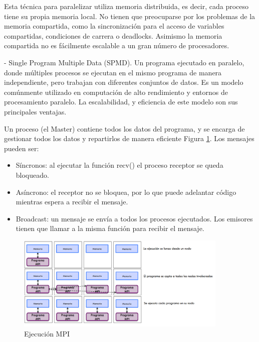 \newpage

Esta técnica para paralelizar utiliza memoria distribuida, es decir, cada proceso tiene su propia memoria local. No tienen que preocuparse por los problemas de la memoria compartida, como la sincronización para el acceso de variables compartidas, condiciones de carrera o deadlocks. Asimismo la memoria compartida no es fácilmente escalable a un gran número de procesadores\cite{barker2015message}.


- Single Program Multiple Data (SPMD). Un programa ejecutado en paralelo, donde múltiples procesos se ejecutan en el mismo programa de manera independiente, pero trabajan con diferentes conjuntos de datos. Es un modelo comúnmente utilizado en computación de alto rendimiento y entornos de procesamiento paralelo. La escalabilidad, y eficiencia de este modelo son sus principales ventajas.

Un proceso (el Master) contiene todos los datos del programa, y se encarga de gestionar todos los datos y repartirlos de manera eficiente Figura \ref{fig:ejecucion_mpi}. Los mensajes pueden ser:

\begin{itemize}
	\item Síncronos: al ejecutar la función recv() el proceso receptor se queda bloqueado.
	\item Asíncrono: el receptor no se bloquea, por lo que puede adelantar código mientras espera a recibir el mensaje.
	\item Broadcast: un mensaje se envía a todos los procesos ejecutados. Los emisores tienen que llamar a la misma función para recibir el mensaje.
\end{itemize}




\begin{figure}[!h]
	\centering
	\includegraphics[width=0.9\textwidth]{images/chapter_2/mpi_2}
	\caption{Ejecución MPI}
	\label{fig:ejecucion_mpi}
\end{figure}


